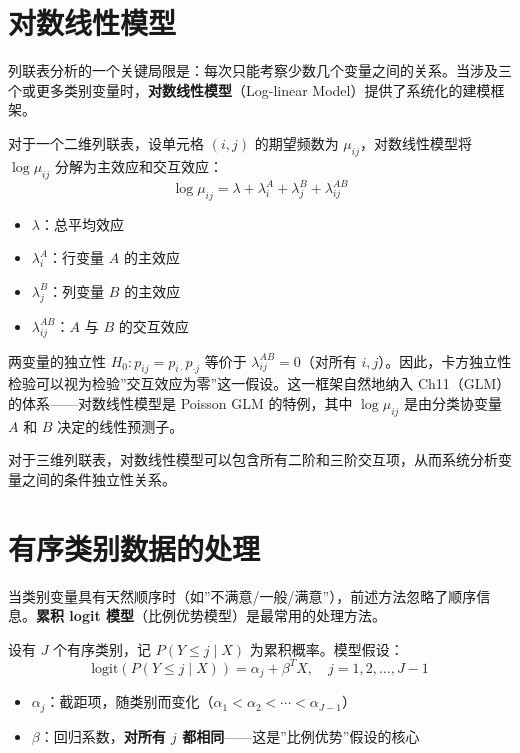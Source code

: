 \documentclass[
]{book}
\providecommand{\tightlist}{%
  \setlength{\itemsep}{0pt}\setlength{\parskip}{0pt}}
\begin{document}
\section{对数线性模型}\label{ux5bf9ux6570ux7ebfux6027ux6a21ux578b}

列联表分析的一个关键局限是：每次只能考察少数几个变量之间的关系。当涉及三个或更多类别变量时，\textbf{对数线性模型}（Log-linear Model）提供了系统化的建模框架。

对于一个二维列联表，设单元格 \((i,j)\) 的期望频数为 \(\mu_{ij}\)，对数线性模型将 \(\log \mu_{ij}\) 分解为主效应和交互效应：
\[
\log \mu_{ij} = \lambda + \lambda_i^A + \lambda_j^B + \lambda_{ij}^{AB}
\]

\begin{itemize}
\tightlist
\item
  \(\lambda\)：总平均效应
\item
  \(\lambda_i^A\)：行变量 \(A\) 的主效应
\item
  \(\lambda_j^B\)：列变量 \(B\) 的主效应
\item
  \(\lambda_{ij}^{AB}\)：\(A\) 与 \(B\) 的交互效应
\end{itemize}

两变量的独立性 \(H_0: p_{ij} = p_{i\cdot} p_{\cdot j}\) 等价于 \(\lambda_{ij}^{AB} = 0\)（对所有 \(i,j\)）。因此，卡方独立性检验可以视为检验''交互效应为零''这一假设。这一框架自然地纳入 Ch11（GLM）的体系------对数线性模型是 Poisson GLM 的特例，其中 \(\log \mu_{ij}\) 是由分类协变量 \(A\) 和 \(B\) 决定的线性预测子。

对于三维列联表，对数线性模型可以包含所有二阶和三阶交互项，从而系统分析变量之间的条件独立性关系。

\section{有序类别数据的处理}\label{ux6709ux5e8fux7c7bux522bux6570ux636eux7684ux5904ux7406}

当类别变量具有天然顺序时（如''不满意/一般/满意''），前述方法忽略了顺序信息。\textbf{累积 logit 模型}（比例优势模型）是最常用的处理方法。

设有 \(J\) 个有序类别，记 \(P(Y \leq j \mid X)\) 为累积概率。模型假设：
\[
\text{logit}(P(Y \leq j \mid X)) = \alpha_j + \beta^T X, \quad j = 1, 2, \ldots, J-1
\]

\begin{itemize}
\tightlist
\item
  \(\alpha_j\)：截距项，随类别而变化（\(\alpha_1 < \alpha_2 < \cdots < \alpha_{J-1}\)）
\item
  \(\beta\)：回归系数，\textbf{对所有 \(j\) 都相同}------这是''比例优势''假设的核心
\end{itemize}
\end{document}
